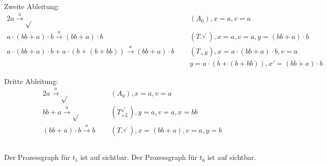 \documentclass[10pt,a4paper,oneside,ngerman,numbers=noenddot]{scrartcl}
\begin{document}
    Zweite Ableitung:
    \begin{alignat*}{2}
        a \overset{a}{\rightarrow} \sqrt{} \;&&\; (A_0), x = a, v = a \\
        a \cdot (bb + a) \cdot b \overset{a}{\rightarrow} (bb + a) \cdot b \;&&\; (T.^{\sqrt{}}), x = a, v = a, y = (bb + a) \cdot b \\
        a \cdot (bb + a) \cdot b + a \cdot (b + (b + bb)) \overset{a}{\rightarrow} (bb + a) \cdot b \;&&\; (T_{+R}), x = a \cdot (bb + a) \cdot b, v = a \\
        &&\; y = a \cdot (b + (b + bb)), x' = (bb + a) \cdot b
    \end{alignat*}

    Dritte Ableitung:
    \begin{alignat*}{2}
        a \overset{a}{\rightarrow} \sqrt{} \;&&\; (A_0), x = a, v = a \\
        bb + a \overset{a}{\rightarrow} \sqrt{} \;&&\; (T^{\sqrt{}}_{+L}), y = a, v = a, x = bb \\
        (bb + a) \cdot b \overset{a}{\rightarrow} b \;&&\; (T.^{\sqrt{}}), x = (bb + a), v = a, y = b
    \end{alignat*}

    \subsection{}
    Der Prozessgraph für \(t_5\) ist auf  sichtbar. Der Prozessgraph für \(t_6\) ist auf  sichtbar.
\end{document}
